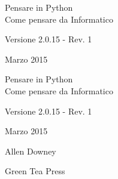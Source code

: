 \documentclass[10pt]{book}
\newcommand{\theversion}{2.0.15 - Rev. 1}
\newcommand{\thedate}{Marzo 2015}
\begin{document}
\begin{latexonly}

\renewcommand{\blankpage}{\thispagestyle{empty} \quad \newpage}



\thispagestyle{empty}

\begin{flushright}
\vspace*{2.0in}

\begin{spacing}{3}
{\huge Pensare in Python}\\
{\Large Come pensare da Informatico}
\end{spacing}

\vspace{0.25in}

Versione \theversion

\thedate

\vfill

\end{flushright}


\blankpage
\blankpage

\pagebreak
\thispagestyle{empty}

\begin{flushright}
\vspace*{2.0in}

\begin{spacing}{3}
{\huge Pensare in Python}\\
{\Large Come pensare da Informatico}
\end{spacing}

\vspace{0.25in}

Versione \theversion

\thedate

\vspace{1in}


{\Large
Allen Downey\\
}


\vspace{0.5in}

{\Large Green Tea Press}


\end{flushright}
\end{latexonly}
\end{document}
